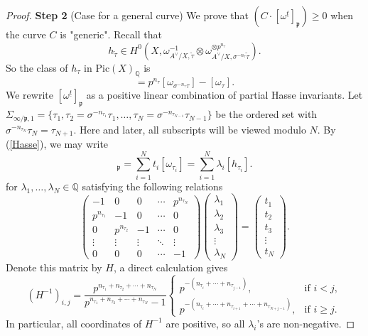 \documentclass{article}
\begin{document}
\begin{proof}
\medskip
\noindent
\textbf{Step 2} (Case for a general curve) We prove that $(C\cdot [\omega^{\underline{t}}]_\mathfrak{p})\ge0$ when the curve $C$ is "generic". Recall that 
\begin{equation}
h_{\tilde\tau}\in H^0(X,\omega_{A^\vee/X,\tilde\tau}^{-1}\otimes\omega^{\otimes p^{n_\tau}}_{A^\vee/X,\sigma^{-n_\tau}\tilde\tau}).
\end{equation}
So the class of $h_\tau$ in $\text{Pic}(X)_\mathbb{Q}$ is
\begin{equation}
[h_\tau]=p^{n_\tau}[\omega_{\sigma^{-n_\tau}\tau}]-[\omega_\tau].
\end{equation}
We rewrite $[\omega^{\underline{t}}]_{\mathfrak{p}}$ as a positive linear combination of partial Hasse invariants. Let $\Sigma_{\infty/\mathfrak{p},1}=\{\tau_1,\tau_2=\sigma^{-n_{\tau_1}}\tau_1,\dots,\tau_N=\sigma^{-n_{\tau_{N-1}}}\tau_{N-1}\}$ be the ordered set with $\sigma^{-n_{\tau_N}}\tau_N=\tau_{N+1}$. Here and later, all subscripts will be viewed modulo $N$. By (\ref{Hasse}), we may write
\begin{equation}
[\omega^{\underline{t}}]_\mathfrak{p}=\sum_{i=1}^N t_i[\omega_{\tau_i}]= \sum_{i=1}^N\lambda_i [h_{\tau_i}].
\end{equation}
for $\lambda_1,\dots,\lambda_N\in\mathbb{Q}$ satisfying the following relations
\begin{equation}
\left(
\begin{matrix}
-1 & 0 & 0 & \cdots &p^{n_{\tau_N}} \\
p^{n_{\tau_1}} & -1 & 0 & \cdots &0 \\
0 & p^{n_{\tau_2}} & -1 & \cdots &0 \\
\vdots & \vdots &\vdots & \ddots &\vdots \\
0 & 0 & 0 & \cdots &-1
\end{matrix}\right)
\left(
\begin{matrix}
\lambda_1\\
\lambda_2\\
\lambda_3\\
\vdots\\
\lambda_N
\end{matrix}
\right)=
\left(
\begin{matrix}
t_1\\
t_2\\
t_3\\
\vdots\\
t_N
\end{matrix}
\right).
\end{equation}
Denote this matrix by $H$, a direct calculation gives
\begin{equation}
(H^{-1})_{i,j}= \frac{p^{n_{\tau_1}+n_{\tau_2}+\cdots+n_{\tau_N}}}{p^{n_{\tau_1}+n_{\tau_2}+\cdots+n_{\tau_N}}-1}
\begin{cases}
p^{-(n_{\tau_i}+\cdots+n_{\tau_{j-1}})} ,  & \text{if $i<j$}, \\
p^{-(n_{\tau_i}+\cdots+n_{\tau_{i+1}}+\cdots+n_{\tau_{N+j-1}})}, & \text{if $i\ge j$}.
\end{cases}
\end{equation}
In particular, all coordinates of $H^{-1}$ are positive, so all $\lambda_i$'s are non-negative.


\end{proof}
\end{document}
